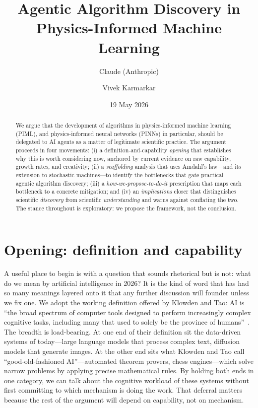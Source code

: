 \documentclass[11pt]{article}
\title{Agentic Algorithm Discovery in Physics-Informed Machine Learning}
\author{Claude (Anthropic) \and Vivek Karmarkar}
\date{19 May 2026}
\begin{document}
\maketitle

\begin{abstract}
\noindent We argue that the development of algorithms in physics-informed machine learning (PIML), and physics-informed neural networks (PINNs) in particular, should be delegated to AI agents as a matter of legitimate scientific practice. The argument proceeds in four movements: (i) a definition-and-capability \emph{opening} that establishes why this is worth considering now, anchored by current evidence on raw capability, growth rates, and creativity; (ii) a \emph{scaffolding} analysis that uses Amdahl's law---and its extension to stochastic machines---to identify the bottlenecks that gate practical agentic algorithm discovery; (iii) a \emph{how-we-propose-to-do-it} prescription that maps each bottleneck to a concrete mitigation; and (iv) an \emph{implications} closer that distinguishes scientific \emph{discovery} from scientific \emph{understanding} and warns against conflating the two. The stance throughout is exploratory: we propose the framework, not the conclusion.
\end{abstract}

\section{Opening: definition and capability}

A useful place to begin is with a question that sounds rhetorical but is not: what do we mean by artificial intelligence in 2026? It is the kind of word that has had so many meanings layered onto it that any further discussion will founder unless we fix one. We adopt the working definition offered by Klowden and Tao: AI is ``the broad spectrum of computer tools designed to perform increasingly complex cognitive tasks, including many that used to solely be the province of humans''~\cite{klowden2026math}. The breadth is load-bearing. At one end of their definition sit the data-driven systems of today---large language models that process complex text, diffusion models that generate images. At the other end sits what Klowden and Tao call ``good-old-fashioned AI''---automated theorem provers, chess engines---which solve narrow problems by applying precise mathematical rules. By holding both ends in one category, we can talk about the cognitive workload of these systems without first committing to which mechanism is doing the work. That deferral matters because the rest of the argument will depend on capability, not on mechanism.
\end{document}
